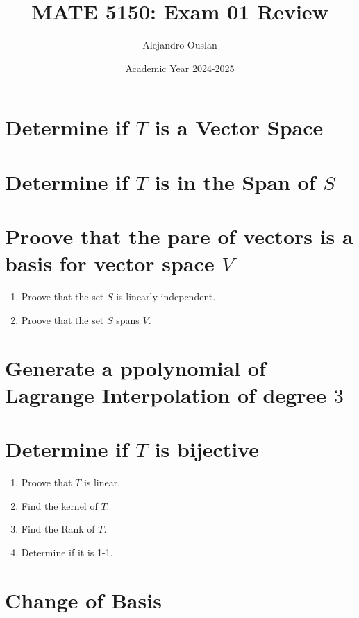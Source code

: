 \documentclass[10pt, oneside]{article}
\title{MATE 5150: Exam 01 Review}
\author{Alejandro Ouslan}
\date{Academic Year 2024-2025}
\begin{document}
\maketitle
\tableofcontents

\vspace{.25in}

\section{Determine if $T$ is a Vector Space}

\section{Determine if $T$ is in the Span of $S$}

\section{Proove that the pare of vectors is a basis for vector space $V$}

\begin{enumerate}
	\item Proove that the set $S$ is linearly independent.
	\item Proove that the set $S$ spans $V$.
\end{enumerate}

\section{Generate a ppolynomial of Lagrange Interpolation of degree $3$}

\section{Determine if $T$ is bijective}

\begin{enumerate}
	\item Proove that $T$ is linear.
	\item Find the kernel of $T$.
	\item Find the Rank of $T$.
	\item Determine if it is 1-1.
\end{enumerate}

\section{Change of Basis}
\end{document}
